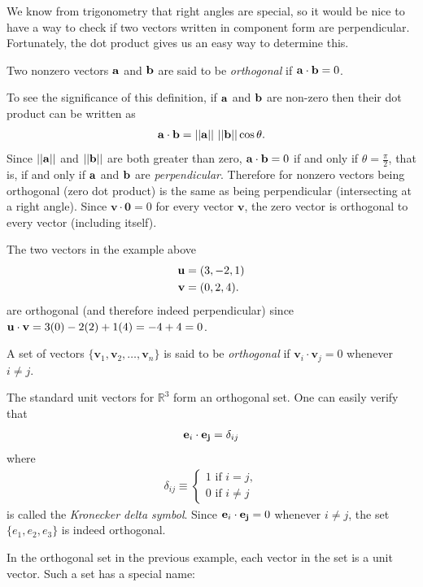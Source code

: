 \documentclass[12pt,letterpaper,reqno]{article}
\numberwithin{equation}{section}
\newcommand{\ti}[1]{\textit{#1}}
\begin{document}
We know from trigonometry that right angles are special, so it would be nice to have a way to check if two vectors written in component form are perpendicular. Fortunately, the dot product gives us an easy way to determine this. 
\begin{defn}\label{prop:orthogonal_vectors}
	Two nonzero vectors ${\bf a}$ and ${\bf b}$ are said to be \emph{orthogonal} if ${\bf a}\cdot {\bf b}=0$.
\end{defn}
To see the significance of this definition, if ${\bf a}$ and ${\bf b}$ are non-zero then their dot product can be written as
\begin{align*}
	{\bf a}\cdot {\bf b}=||{\bf a}|| \ ||{\bf b}||\cos \theta.
\end{align*}	
Since $||{\bf a}||$ and $||{\bf b}||$ are both greater than zero, ${\bf a}\cdot {\bf b}=0$ if and only if $\theta=\frac{\pi}{2}$, that is, if and only if ${\bf a}$ and ${\bf b}$ are \emph{perpendicular}. Therefore for nonzero vectors being orthogonal (zero dot product) is the same as being perpendicular (intersecting at a right angle). Since $\mathbf{v}\cdot \mathbf{0}=0$ for every vector $\mathbf{v}$, the zero vector is orthogonal to every vector (including itself).

\begin{example}
The two vectors in the example above	
\begin{align*}
	{\bf u}&=(3,-2,1) \\
	{\bf v}&=(0,2,4).
\end{align*}
are orthogonal (and therefore indeed perpendicular) since ${\bf u}\cdot {\bf v}=3(0)-2(2)+1(4)=-4+4=0$.
\end{example}

\begin{defn}
	A set of vectors $\{\mathbf{v}_1,\mathbf{v}_2,\dots,\mathbf{v}_n\}$ is said to be \emph{orthogonal} if $\mathbf{v}_i \cdot \mathbf{v}_j=0$ whenever $i \neq j$.
\end{defn}


\begin{example}
	The standard unit vectors for $\mathbb{R}^3$ form an orthogonal set. One can easily verify that 
	\begin{align*}
		{\bf e}_i \cdot {\bf e_j}=\delta_{ij}
	\end{align*}
where 
\begin{align*}
	\delta_{ij} \equiv \begin{cases}
		1 \text{ if } i=j, \\
		0 \text{ if } i \neq j
	\end{cases}
\end{align*}
is called the \ti{Kronecker delta symbol}. Since ${\bf e}_i \cdot {\bf e_j}=0$ whenever $i \neq j$, the set $\{e_1, e_2, e_3\}$ is indeed orthogonal. 
\end{example}
In the orthogonal set in the previous example, each vector in the set is a unit vector. Such a set has a special name:
\end{document}
